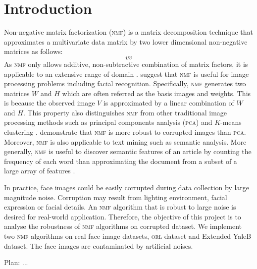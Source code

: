 \section{Introduction\label{chapter1}}
Non-negative matrix factorization (\textsc{nmf}) is a matrix decomposition technique that approximates a multivariate data matrix by two lower dimensional non-negative matrices as follows:
\begin{equation*}
  vv
\end{equation*}
As \textsc{nmf} only allows additive, non-subtractive combination of matrix factors, it is applicable to an extensive range of domain . \citet{lee1999learning} suggest that \textsc{nmf} is useful for image processing problems including facial recognition. Specifically, \textsc{nmf} generates two matrices $W$ and $H$ which are often referred as the basis images and weights. This is because the observed image $V$ is approximated by a linear combination of $W$ and $H$. This property also distinguishes \textsc{nmf} from other traditional image processing methods such as principal components analysis (\textsc{pca}) and $K$-means clustering . \citet{guillamet2002non} demonstrate that \textsc{nmf} is more robust to corrupted images than \textsc{pca}.
Moreover, \textsc{nmf} is also applicable to text mining such as semantic analysis. More generally, \textsc{nmf} is useful to discover semantic features of an article by counting the frequency of each word than approximating the document from a subset of a large array of features \citep{lee1999learning}.

In practice, face images could be easily corrupted during data collection by large magnitude noise. Corruption may result from lighting environment, facial expression or facial details. An \textsc{nmf} algorithm that is robust to large noise is desired for real-world application. Therefore, the objective of this project is to analyse the robustness of \textsc{nmf} algorithms on corrupted dataset. We implement two \textsc{nmf} algorithms on real face image datasets, \textsc{orl} dataset and Extended YaleB dataset. The face images are contaminated by artificial noises.

Plan:
...



